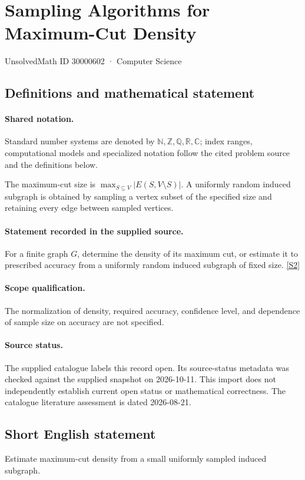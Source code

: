 \documentclass[11pt]{article}
\newcommand{\sref}[2]{\hyperlink{source:#1:#2}{[S#2]}}
\begin{document}
\setcounter{section}{30000601}
\section{Sampling Algorithms for Maximum-Cut Density}\label{30000602}
{\small\sffamily UnsolvedMath ID 30000602 · Computer Science}
\subsection{Definitions and mathematical statement}

\paragraph{Shared notation.}Standard number systems are denoted by $\mathbb N,\mathbb Z,\mathbb Q,\mathbb R,\mathbb C$; index ranges, computational models and specialized notation follow the cited problem source and the definitions below.


The maximum-cut size is $\max_{S\subseteq V}|E(S,V\setminus S)|$. A uniformly random induced subgraph is obtained by sampling a vertex subset of the specified size and retaining every edge between sampled vertices.
\paragraph{Statement recorded in the supplied source.}
For a finite graph $G$, determine the density of its maximum cut, or estimate it to prescribed accuracy from a uniformly random induced subgraph of fixed size. \sref{30000602}{2}
\paragraph{Scope qualification.}
The normalization of density, required accuracy, confidence level, and dependence of sample size on accuracy are not specified.
\paragraph{Source status.}
The supplied catalogue labels this record open. Its source-status metadata was checked against the supplied snapshot on 2026-10-11. This import does not independently establish current open status or mathematical correctness. The catalogue literature assessment is dated 2026-08-21.
\subsection{Short English statement}
Estimate maximum-cut density from a small uniformly sampled induced subgraph.
\end{document}

